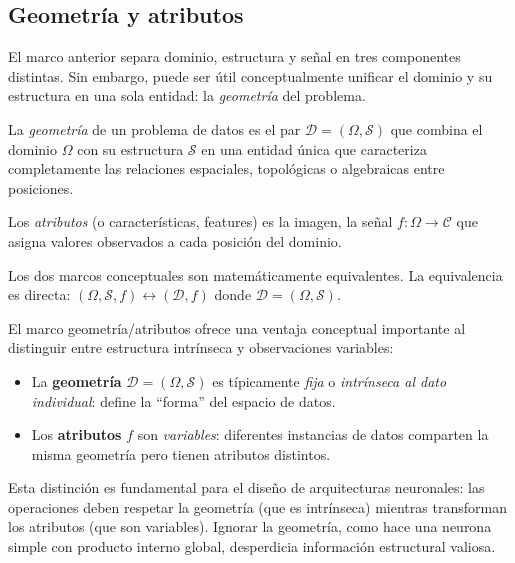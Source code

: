 \subsection{Geometría y atributos}\label{sec:geometria_atributos}

El marco anterior separa dominio, estructura y señal en tres componentes distintas. Sin embargo, puede ser útil conceptualmente unificar el dominio y su estructura en una sola entidad: la \textit{geometría} del problema.

\begin{definition}\label{def:geometria_dominio}
La \textit{geometría} de un problema de datos es el par $\mathcal{D} = (\Omega, \mathcal{S})$ que combina el dominio $\Omega$ con su estructura $\mathcal{S}$ en una entidad única que caracteriza completamente las relaciones espaciales, topológicas o algebraicas entre posiciones.
\end{definition}

\begin{definition}[Atributos]\label{def:atributos}
Los \textit{atributos} (o características, features) es la imagen, la señal $f: \Omega \to \mathcal{C}$ que asigna valores observados a cada posición del dominio.
\end{definition}

Los dos marcos conceptuales son matemáticamente equivalentes\label{rem:equivalencia_marcos}. La equivalencia es directa: $(\Omega, \mathcal{S}, f) \leftrightarrow (\mathcal{D}, f)$ donde $\mathcal{D} = (\Omega, \mathcal{S})$.

El marco geometría/atributos ofrece una ventaja conceptual importante al distinguir entre estructura intrínseca y observaciones variables:

\begin{itemize}
	\item La \textbf{geometría} $\mathcal{D} = (\Omega, \mathcal{S})$ es típicamente \textit{fija} o \textit{intrínseca al dato individual}: define la ``forma'' del espacio de datos.

	\item Los \textbf{atributos} $f$ son \textit{variables}: diferentes instancias de datos comparten la misma geometría pero tienen atributos distintos.
\end{itemize}

Esta distinción es fundamental para el diseño de arquitecturas neuronales: las operaciones deben respetar la geometría (que es intrínseca) mientras transforman los atributos (que son variables). Ignorar la geometría, como hace una neurona simple con producto interno global, desperdicia información estructural valiosa.

